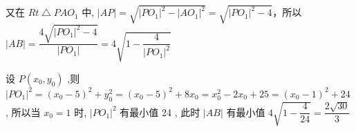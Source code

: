 \begin{enumerate}
\begin{jieda}
    又在 $Rt \bigtriangleup {PA}{O}_{1}$ 中, $\left| {AP}\right|  = \sqrt{{\left| P{O}_{1}\right| }^{2} - {\left| A{O}_{1}\right| }^{2}} = \sqrt{{\left| P{O}_{1}\right| }^{2} - 4}$，所以 $\left| {AB}\right|  = \dfrac{4\sqrt{{\left| P{O}_{1}\right| }^{2} - 4}}{\left| P{O}_{1}\right| } = 4\sqrt{1 - \dfrac{4}{{\left| P{O}_{1}\right| }^{2}}}$
    
    设 $P\left( {{x}_{0},{y}_{0}}\right)$ ,则 ${\left| P{O}_{1}\right| }^{2} = {\left( {x}_{0} - 5\right) }^{2} + {y}_{0}^{2} = {\left( {x}_{0} - 5\right) }^{2} + 8{x}_{0} = {x}_{0}^{2} - 2{x}_{0} + {25} = {\left( {x}_{0} - 1\right) }^{2} + {24}$ ,
    所以当 ${x}_{0} = 1$ 时, ${\left| P{O}_{1}\right| }^{2}$ 有最小值 24 ,
    此时 $\left| {AB}\right|$ 有最小值 $4\sqrt{1 - \dfrac{4}{24}} = \dfrac{2\sqrt{30}}{3}$
    \end{jieda}
\end{enumerate}
